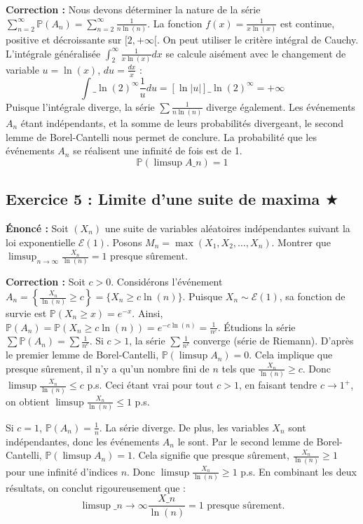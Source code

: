 \documentclass[11pt,a4paper]{article}
\begin{document}
\textbf{Correction :}
Nous devons déterminer la nature de la série $\sum_{n=2}^\infty \mathbb{P}(A_n) = \sum_{n=2}^\infty \frac{1}{n \ln(n)}$.
La fonction $f(x) = \frac{1}{x \ln(x)}$ est continue, positive et décroissante sur $[2, +\infty[$.
On peut utiliser le critère intégral de Cauchy.
L'intégrale généralisée $\int_2^\infty \frac{1}{x \ln(x)} dx$ se calcule aisément avec le changement de variable $u = \ln(x)$, $du = \frac{dx}{x}$ :
$$ \int\_{\ln(2)}^\infty \frac{1}{u} du = \left[ \ln|u| \right]\_{\ln(2)}^\infty = +\infty $$
Puisque l'intégrale diverge, la série $\sum \frac{1}{n \ln(n)}$ diverge également.
Les événements $A_n$ étant indépendants, et la somme de leurs probabilités divergeant, le second lemme de Borel-Cantelli nous permet de conclure.
La probabilité que les événements $A_n$ se réalisent une infinité de fois est de 1.
$$ \mathbb{P}(\limsup A\_n) = 1 $$


\subsection*{Exercice 5 : Limite d'une suite de maxima \quad $\bigstar$}





\textbf{Énoncé :}
Soit $(X_n)$ une suite de variables aléatoires indépendantes suivant la loi exponentielle $\mathcal{E}(1)$.
Posons $M_n = \max(X_1, X_2, \dots, X_n)$.
Montrer que $\limsup_{n \to \infty} \frac{X_n}{\ln(n)} = 1$ presque sûrement.

\textbf{Correction :}
Soit $c > 0$. Considérons l'événement $A_n = \left\{ \frac{X_n}{\ln(n)} \ge c \right\} = \{ X_n \ge c \ln(n) \}$.
Puisque $X_n \sim \mathcal{E}(1)$, sa fonction de survie est $\mathbb{P}(X_n \ge x) = e^{-x}$.
Ainsi, $\mathbb{P}(A_n) = \mathbb{P}(X_n \ge c \ln(n)) = e^{-c \ln(n)} = \frac{1}{n^c}$.
Étudions la série $\sum \mathbb{P}(A_n) = \sum \frac{1}{n^c}$.
Si $c > 1$, la série $\sum \frac{1}{n^c}$ converge (série de Riemann).
D'après le premier lemme de Borel-Cantelli, $\mathbb{P}(\limsup A_n) = 0$.
Cela implique que presque sûrement, il n'y a qu'un nombre fini de $n$ tels que $\frac{X_n}{\ln(n)} \ge c$.
Donc $\limsup \frac{X_n}{\ln(n)} \le c$ p.s.
Ceci étant vrai pour tout $c > 1$, en faisant tendre $c \to 1^+$, on obtient $\limsup \frac{X_n}{\ln(n)} \le 1$ p.s.

Si $c = 1$, $\mathbb{P}(A_n) = \frac{1}{n}$. La série diverge.
De plus, les variables $X_n$ sont indépendantes, donc les événements $A_n$ le sont.
Par le second lemme de Borel-Cantelli, $\mathbb{P}(\limsup A_n) = 1$.
Cela signifie que presque sûrement, $\frac{X_n}{\ln(n)} \ge 1$ pour une infinité d'indices $n$.
Donc $\limsup \frac{X_n}{\ln(n)} \ge 1$ p.s.
En combinant les deux résultats, on conclut rigoureusement que :
$$ \limsup\_{n \to \infty} \frac{X\_n}{\ln(n)} = 1 \text{ presque sûrement.} $$
\end{document}
